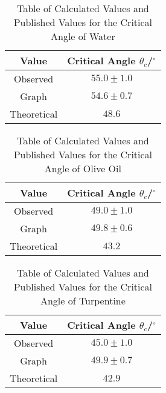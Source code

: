 \documentclass{article}
\begin{document}
\vspace{5mm}
\begin{table*}[h]
\centering %
\caption{Table of Calculated Values and Published Values for the Critical Angle of Water}
\label{tab:table-water2}
\begin{tabular}{|c|c|}
\hline
Value & Critical Angle $\theta_c$/$^{\circ}$ \\
\hline
Observed & $55.0\pm 1.0$  \\
\hline
Graph & $54.6 \pm 0.7$ \\
\hline
Theoretical \cite{Web01} & $48.6$ \\
\hline
\end{tabular}
\end{table*}

\vspace{5mm}
\begin{table*}[h]
\centering %
\caption{Table of Calculated Values and Published Values for the Critical Angle of Olive Oil}
\label{tab:table-oil2}
\begin{tabular}{|c|c|}
\hline
Value & Critical Angle $\theta_c$/$^{\circ}$ \\
\hline
Observed & $49.0\pm 1.0$  \\
\hline
Graph & $49.8 \pm 0.6$ \\
\hline
Theoretical \cite{Web01} & $43.2$ \\
\hline
\end{tabular}
\end{table*}

\vspace{5mm}
\begin{table*}[h]
\centering %
\caption{Table of Calculated Values and Published Values for the Critical Angle of Turpentine}
\label{tab:table-turpentine2}
\begin{tabular}{|c|c|}
\hline
Value & Critical Angle $\theta_c$/$^{\circ}$ \\
\hline
Observed & $45.0\pm 1.0$  \\
\hline
Graph & $49.9 \pm 0.7$ \\
\hline
Theoretical \cite{Web01} & $42.9$ \\
\hline
\end{tabular}
\end{table*}
\end{document}
